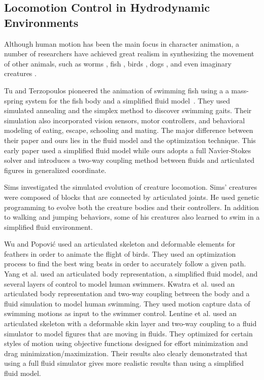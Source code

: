 \subsection{Locomotion Control in Hydrodynamic Environments}
Although human motion has been the main focus in
character animation, a number of researchers have achieved great
realism in synthesizing the movement of other animals, such as worms
\cite{Miller:1989:GDS}, fish \cite{tu1994artificial}, birds
\cite{wu2003realistic}, dogs \cite{Kry:2009:ML}, and even imaginary
creatures \cite{wampler2009optimal,hecker2008real}.

Tu and Terzopoulos pioneered the animation of swimming fish using a a
mass-spring system for the fish body and a simplified fluid
model~\cite{tu1994artificial,terzopoulos1994artificial,Grzeszczuk95automatedlearning}. They used simulated annealing and the simplex method to discover swimming gaits. Their simulation also incorporated vision sensors, motor controllers, and behavioral modeling
of eating, escape, schooling and mating.  The
major difference between their paper and ours lies in the fluid model and the optimization technique. This early paper used a
simplified fluid model while ours adopts a full Navier-Stokes solver and introduces a two-way coupling method between
fluids and articulated figures in generalized coordinate.

Sims \cite{sims1994creatures} investigated the simulated evolution of
creature locomotion.  Sims' creatures were composed
of blocks that are connected by articulated joints. He used genetic
programming to evolve both the creature bodies and their controllers.  In
addition to walking and jumping behaviors, some of his creatures also
learned to swim in a simplified fluid environment.

Wu and Popovi\'{c} \cite{wu2003realistic} used an articulated skeleton and deformable elements for
feathers in order to animate the flight of birds.
They used an optimization process to find the best wing beats in order to
accurately follow a given path.  Yang et al. \cite{yang2004layered} used an articulated body
representation, a simplified fluid model, and several layers of control to
model human swimmers.  Kwatra et al. \cite{kwatra2009fluid} used an
articulated body representation and two-way coupling between the body and a
fluid simulation to model human swimming.  They used
motion capture data of swimming motions as input to the swimmer control.
Lentine et al. \cite{lentine2010creature} used an articulated skeleton with a deformable skin layer and
two-way coupling to a fluid simulator to model figures that are moving in
fluids.  They optimized for certain styles of
motion using objective functions designed for effort minimization and drag
minimization/maximization.  Their results also clearly demonstrated that
using a full fluid simulator gives more realistic results than using a
simplified fluid model.

